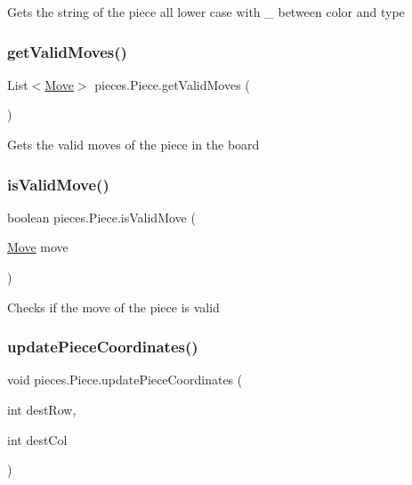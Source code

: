 Gets the string of the piece all lower case with \+\_\+ between color and type \mbox{\label{classpieces_1_1_piece_aa4bfcbf5e6e3c1374c0ca3af0c64b87d}} 
\subsubsection{\texorpdfstring{get\+Valid\+Moves()}{getValidMoves()}}
{\footnotesize\ttfamily List$<$\mbox{\hyperlink{classpieces_1_1_move}{Move}}$>$ pieces.\+Piece.\+get\+Valid\+Moves (\begin{DoxyParamCaption}{ }\end{DoxyParamCaption})}

Gets the valid moves of the piece in the board \mbox{\label{classpieces_1_1_piece_a24536ff95674905f18a7fd9fadde52ce}} 
\subsubsection{\texorpdfstring{is\+Valid\+Move()}{isValidMove()}}
{\footnotesize\ttfamily boolean pieces.\+Piece.\+is\+Valid\+Move (\begin{DoxyParamCaption}\item[{\mbox{\hyperlink{classpieces_1_1_move}{Move}}}]{move }\end{DoxyParamCaption})}

Checks if the move of the piece is valid \mbox{\label{classpieces_1_1_piece_abad4a76991f2de3a31187c2a74c2f870}} 
\subsubsection{\texorpdfstring{update\+Piece\+Coordinates()}{updatePieceCoordinates()}}
{\footnotesize\ttfamily void pieces.\+Piece.\+update\+Piece\+Coordinates (\begin{DoxyParamCaption}\item[{int}]{dest\+Row,  }\item[{int}]{dest\+Col }\end{DoxyParamCaption})}

